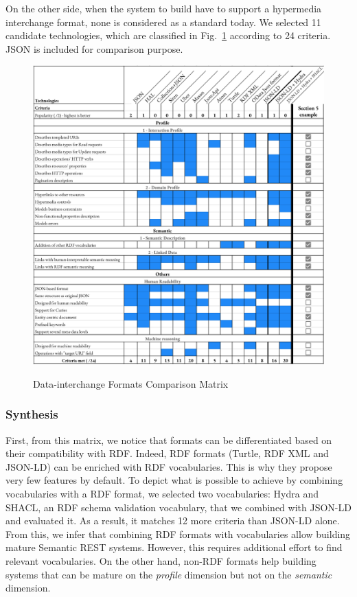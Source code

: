 On the other side, when the system to build have to support a hypermedia interchange format, none is considered as a standard today. We selected 11 candidate technologies, which are classified in Fig.~\ref{interchange-formats-matrix} according to 24 criteria. JSON is included for comparison purpose.

\begin{figure}[!ht]
\caption{Data-interchange Formats Comparison Matrix}
\includegraphics[width=1\textwidth]{figures/DIF.png}
\label{interchange-formats-matrix}
\end{figure}

\subsubsection*{Synthesis}
First, from this matrix, we notice that formats can be differentiated based on their compatibility with RDF. Indeed, RDF formats (Turtle, RDF XML and JSON-LD) can be enriched with RDF vocabularies. This is why they propose very few features by default. To depict what is possible to achieve by combining vocabularies with a RDF format, we selected two vocabularies: Hydra and SHACL, an RDF schema validation vocabulary, that we combined with JSON-LD and evaluated it. As a result, it matches 12 more criteria than JSON-LD alone.
From this, we infer that combining RDF formats with vocabularies allow building mature Semantic REST systems. However, this requires additional effort to find relevant vocabularies.
On the other hand, non-RDF formats help building systems that can be mature on the \textit{profile} dimension but not on the \textit{semantic} dimension.

